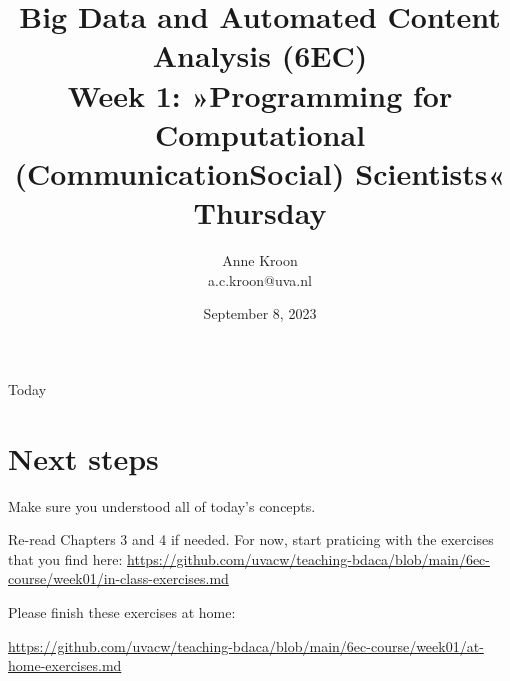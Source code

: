 \documentclass[compress]{beamer}
\begin{document}
\title[Big Data and Automated Content Analysis]{\textbf{Big Data and Automated Content Analysis (6EC)} 
\\Week 1: »Programming for Computational (Communication\textbar Social) Scientists«
\\Thursday }
\author[Anne Kroon]{Anne Kroon\\ \footnotesize{a.c.kroon@uva.nl}}
\date{September 8, 2023}

\begin{frame}{}
	\titlepage
\end{frame}

\begin{frame}{Today}
	\tableofcontents
\end{frame}






\section{Next steps}


\begin{frame}[standout]
Make sure you understood all of today's concepts.

Re-read Chapters 3 and 4 if needed.
For now, start praticing with the exercises that you find here:
\large{\url{https://github.com/uvacw/teaching-bdaca/blob/main/6ec-course/week01/in-class-exercises.md}}

Please finish these exercises at home: 

\large{\url{https://github.com/uvacw/teaching-bdaca/blob/main/6ec-course/week01/at-home-exercises.md}}
\end{frame}


\begin{frame}
	\printbibliography
\end{frame}
\end{document}
